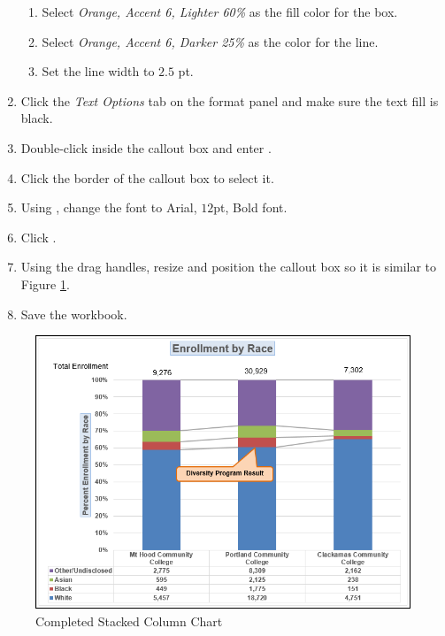 \begin{enumerate}
	\begin{enumerate}
		\item Select \textit{Orange, Accent 6, Lighter 60\%} as the fill color for the box.
		\item Select \textit{Orange, Accent 6, Darker 25\%} as the color for the line.
		\item Set the line width to $ 2.5 $ pt.
	\end{enumerate}
	
	\item Click the \textit{Text Options} tab on the format panel and make sure the text fill is black.
	\item Double-click inside the callout box and enter .
	\item Click the border of the callout box to select it.
	\item Using , change the font to Arial, $ 12 $pt, Bold font. 
	\item Click .
	\item Using the drag handles, resize and position the callout box so it is similar to Figure \ref{04:fig45}.
	\item Save the  workbook.
\end{enumerate}

\begin{figure}[H]
	\centering
	\includegraphics[width=\maxwidth{.95\linewidth}]{gfx/ch04_fig45}
	\caption{Completed Stacked Column Chart}
	\label{04:fig45}
\end{figure}

